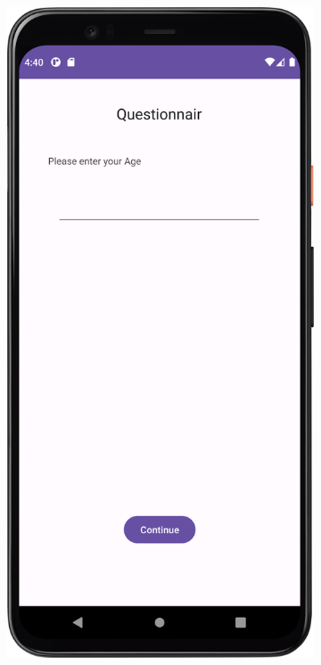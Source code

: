 \begin{figure}[htbp]
    \centering
    \begin{subfigure}[b]{0.25\textwidth}
        \centering
        \includegraphics[width=\textwidth]{content/07_evaluation_of_the_solution/Screenshot_T2a.png}

\end{subfigure}
\end{figure}
